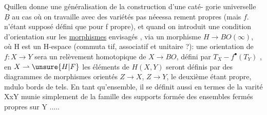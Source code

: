 Quillen donne une généralisation de la construction d'une caté-%
gorie universelle $\underline{B}$ au cas où on travaille avec des variétés pas néeessa%
rement propres (mais $f.$ n'étant supposé défini que pour f propre), et
quand on introduit une condition d'orientation  sur les \uline{morphismes}
envisagés , via un morphisme $H\to BO(\infty)$, où H est un H-espace (commuta%
tif, associatif et unitaire ?): une orientation de $f:X\to Y$ sera un
relèvement homotopique de $X\to BO$, défini par  $T_X-f^{\bullet}(T_Y)$ , en $X\rightharpoonup\unsure{H|F}$
les éléments de $H(X,Y)$ seront définis par des diagrammes de morphismes
orientés $Z\to X$, $Z\to Y$, le deuxième étant propre, mdulo bords de tels.
En tant qu'ensemble, il se définit aussi en termes de la varité XxY
munie simplement de la famille des supports formée des ensembles fermés
propres sur Y ..... 


